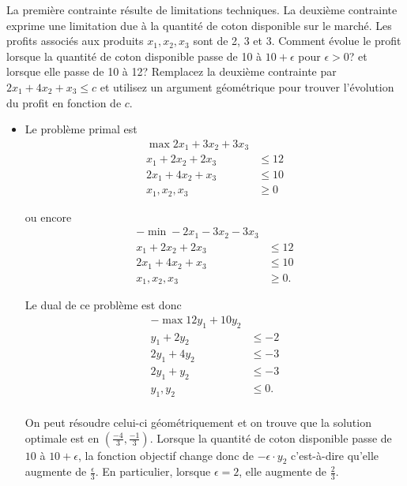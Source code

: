 \begin{enumerate}
    La première contrainte résulte de limitations techniques. La deuxième contrainte exprime une limitation due à la quantité de coton
    disponible sur le marché. Les profits associés aux produits $x_1, x_2, x_3$
    sont de 2, 3 et 3. Comment évolue le profit  lorsque la quantité de coton disponible passe de 10 à $10+ \epsilon$ pour
    $\epsilon >0$? et lorsque elle passe de 10 à 12? Remplacez la deuxième
    contrainte par $2x_1+4x_2 +x_3 \leq c$ et utilisez un argument géométrique pour trouver l'évolution du profit en fonction de $c$.







    \begin{solution}
      \begin{itemize}
        \item Le problème primal est 
          \begin{align*}
            \max 2x_1 + 3x_2 + 3x_3\\
            x_1 + 2x_2 + 2x_3& \leq 12\\
            2 x_1 + 4x_2 + x_3 & \leq 10\\
            x_1, x_2, x_3 & \geq 0
          \end{align*}

          ou encore 
          \begin{align*}
            - \min -2x_1 - 3x_2 - 3x_3\\
            x_1 + 2x_2 + 2x_3& \leq 12\\
            2x_1 + 4x_2 + x_3 & \leq 10\\
            x_1, x_2, x_3 & \geq 0.
          \end{align*}

          Le dual de ce problème est donc
          \begin{align*}
            - \max 12y_1 + 10y_2\\
            y_1 + 2y_2 & \leq -2\\
            2y_1 + 4y_2 & \leq -3\\
            2y_1 + y_2 & \leq -3\\
            y_1, y_2 & \leq 0.\\
          \end{align*}

          On peut résoudre celui-ci géométriquement et on trouve que la
          solution optimale est en $(\frac{-4}{3}, \frac{-1}{3})$.
          Lorsque la quantité de coton disponible passe de $10$ à
          $10+\epsilon$,
          la fonction objectif change donc de $-\epsilon \cdot y_2$
          c'est-à-dire qu'elle augmente de $\frac{\epsilon}{3}$.
          En particulier, lorsque $\epsilon = 2$,
          elle augmente de $\frac{2}{3}$.


\end{itemize}
\end{solution}
\end{enumerate}
